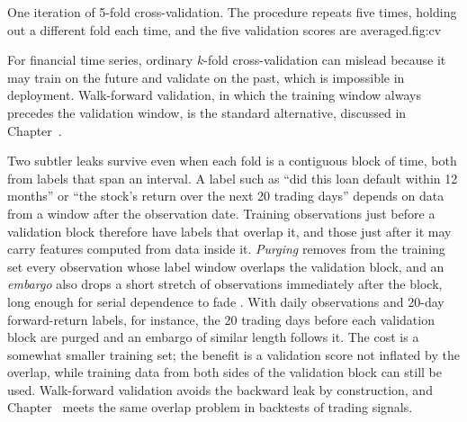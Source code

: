 \documentclass[../ai_in_finance]{subfiles}
\begin{document}
\begin{bookfigure}{One iteration of 5-fold cross-validation. The procedure repeats five times, holding out a different fold each time, and the five validation scores are averaged.}{fig:cv}
\end{bookfigure}

For financial time series, ordinary $k$-fold cross-validation can mislead because it may train on the future and validate on the past, which is impossible in deployment. Walk-forward validation, in which the training window always precedes the validation window, is the standard alternative, discussed in Chapter~.

Two subtler leaks survive even when each fold is a contiguous block of time, both from labels that span an interval. A label such as ``did this loan default within 12 months'' or ``the stock's return over the next 20 trading days'' depends on data from a window after the observation date. Training observations just before a validation block therefore have labels that overlap it, and those just after it may carry features computed from data inside it. \emph{Purging} removes from the training set every observation whose label window overlaps the validation block, and an \emph{embargo} also drops a short stretch of observations immediately after the block, long enough for serial dependence to fade \parencite{lopezdeprado2018advances}. With daily observations and 20-day forward-return labels, for instance, the 20 trading days before each validation block are purged and an embargo of similar length follows it. The cost is a somewhat smaller training set; the benefit is a validation score not inflated by the overlap, while training data from both sides of the validation block can still be used. Walk-forward validation avoids the backward leak by construction, and Chapter~ meets the same overlap problem in backtests of trading signals.
\end{document}
